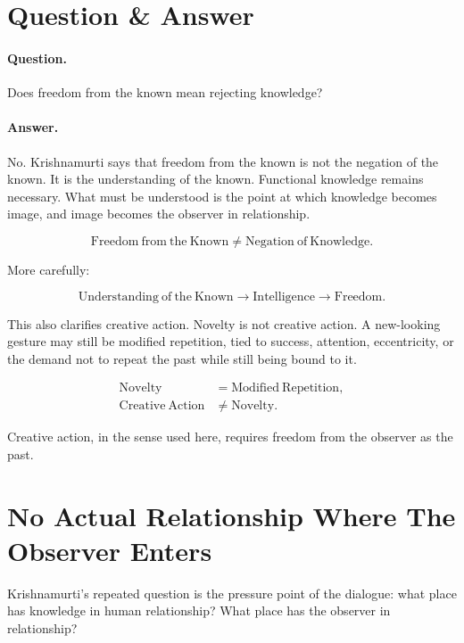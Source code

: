 \documentclass[11pt,oneside]{book}
\begin{document}
\section{Question \& Answer}

\paragraph{Question.}
Does freedom from the known mean rejecting knowledge?

\paragraph{Answer.}
No. Krishnamurti says that freedom from the known is not the negation of the known. It is the understanding of the known. Functional knowledge remains necessary. What must be understood is the point at which knowledge becomes image, and image becomes the observer in relationship.

\begin{equation}
\mathrm{Freedom\ from\ the\ Known}
\neq
\mathrm{Negation\ of\ Knowledge}.
\end{equation}

More carefully:

\begin{equation}
\mathrm{Understanding\ of\ the\ Known}
\longrightarrow
\mathrm{Intelligence}
\longrightarrow
\mathrm{Freedom}.
\end{equation}

This also clarifies creative action. Novelty is not creative action. A new-looking gesture may still be modified repetition, tied to success, attention, eccentricity, or the demand not to repeat the past while still being bound to it.

\begin{align}
\mathrm{Novelty} &= \mathrm{Modified\ Repetition},\\
\mathrm{Creative\ Action} &\neq \mathrm{Novelty}.
\end{align}

Creative action, in the sense used here, requires freedom from the observer as the past.

\section{No Actual Relationship Where The Observer Enters}

Krishnamurti's repeated question is the pressure point of the dialogue: what place has knowledge in human relationship? What place has the observer in relationship?
\end{document}
